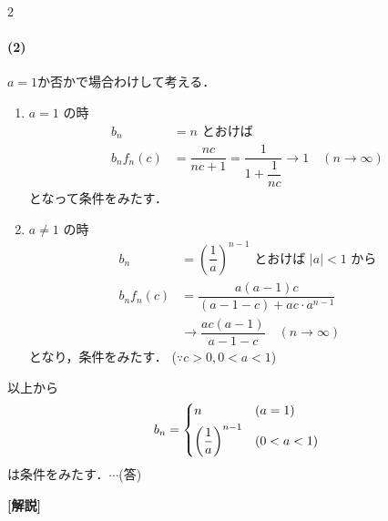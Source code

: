 \documentclass[../../main.tex]{subfiles}
\begin{document}
\begin{multicols}{2}
  \paragraph{(2)}
  $a=1$か否かで場合わけして考える．

  \begin{enumerate}
    \item[$1^\circ$] $a=1$ の時
      \begin{align}
        b_n        & = n \text{ とおけば}                                                                    \\
        b_n f_n(c) & = \dfrac{nc}{nc+1} = \dfrac{1}{1+\dfrac{1}{nc}} \longrightarrow 1 \quad (n \to \infty)
      \end{align}
      となって条件をみたす．
    \item[$2^\circ$] $a \neq 1$ の時
      \begin{align}
        b_n        & = \left(\dfrac{1}{a}\right)^{n-1} \text{ とおけば } |a|<1 \text{ から} \\
        b_n f_n(c) & = \dfrac{a(a-1)c}{(a-1-c)+ac \cdot a^{n-1}}                      \\
        & \longrightarrow \dfrac{ac(a-1)}{a-1-c} \quad (n \to \infty)
      \end{align}
      となり，条件をみたす． ($\because c>0, 0<a<1$)
  \end{enumerate}
  以上から
  \begin{align}
    b_n =
    \begin{dcases}
      n                              & (a=1)   \\
      \left(\dfrac{1}{a}\right)^{n-1} & (0<a<1)
    \end{dcases}
  \end{align}
  は条件をみたす．$\cdots$(答)

  {\bf [解説]}

  \newpage
\end{multicols}
\end{document}
